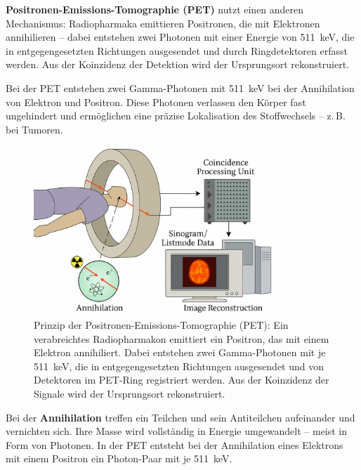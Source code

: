 \textbf{Positronen-Emissions-Tomographie (PET)} nutzt einen anderen Mechanismus: Radiopharmaka emittieren Positronen, die mit Elektronen annihilieren – dabei entstehen zwei Photonen mit einer Energie von \SI{511}{keV}, die in entgegengesetzten Richtungen ausgesendet und durch Ringdetektoren erfasst werden. Aus der Koinzidenz der Detektion wird der Ursprungsort rekonstruiert.
\vspace{1em}
\begin{tcolorbox}[physikbox, title=Photonen bei der PET]
	\label{box:PET}
	\small
	Bei der PET entstehen zwei Gamma-Photonen mit \SI{511}{keV} bei der Annihilation von Elektron und Positron. Diese Photonen verlassen den Körper fast ungehindert und ermöglichen eine präzise Lokalisation des Stoffwechsels – z.\,B. bei Tumoren.
\end{tcolorbox}
\begin{figure}[H]
	\centering
	\includegraphics[width=0.85\textwidth]{bilder/petscan.png}
	\caption{Prinzip der Positronen-Emissions-Tomographie (PET): Ein verabreichtes Radiopharmakon emittiert ein Positron, das mit einem Elektron annihiliert. Dabei entstehen zwei Gamma-Photonen mit je \SI{511}{keV}, die in entgegengesetzten Richtungen ausgesendet und von Detektoren im PET-Ring registriert werden. Aus der Koinzidenz der Signale wird der Ursprungsort rekonstruiert.}
	\label{fig:pet_prinzip}
\end{figure}
\begin{tcolorbox}[didaktikbox, title=Begriffserklärung: Annihilation]
	\label{box:annihilation}
	\small
	Bei der \textbf{Annihilation} treffen ein Teilchen und sein Antiteilchen aufeinander und vernichten sich. Ihre Masse wird vollständig in Energie umgewandelt – meist in Form von Photonen. In der PET entsteht bei der Annihilation eines Elektrons mit einem Positron ein Photon-Paar mit je \SI{511}{keV}.
\end{tcolorbox}
